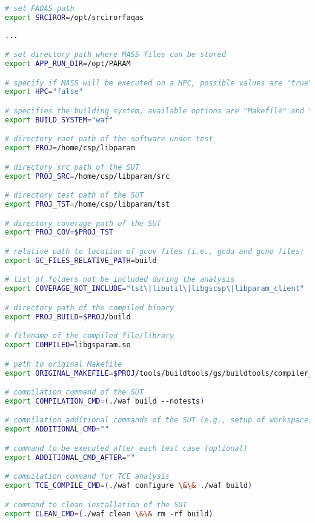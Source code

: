 \begin{lstlisting}[language=bash, label=mass_conf_single, caption=\MASS variables. Excerpt of mass\_conf.sh file.]
# set FAQAS path
export SRCIROR=/opt/srcirorfaqas
                                                     
...

# set directory path where MASS files can be stored
export APP_RUN_DIR=/opt/PARAM

# specify if MASS will be executed on a HPC, possible values are "true" or "false"
export HPC="false"

# specifies the building system, available options are "Makefile" and "waf"
export BUILD_SYSTEM="waf"

# directory root path of the software under test
export PROJ=/home/csp/libparam

# directory src path of the SUT
export PROJ_SRC=/home/csp/libparam/src

# directory test path of the SUT
export PROJ_TST=/home/csp/libparam/tst

# directory coverage path of the SUT
export PROJ_COV=$PROJ_TST

# relative path to location of gcov files (i.e., gcda and gcno files)
export GC_FILES_RELATIVE_PATH=build

# list of folders not be included during the analysis
export COVERAGE_NOT_INCLUDE="tst\|libutil\|libgscsp\|libparam_client"

# directory path of the compiled binary
export PROJ_BUILD=$PROJ/build

# filename of the compiled file/library
export COMPILED=libgsparam.so

# path to original Makefile
export ORIGINAL_MAKEFILE=$PROJ/tools/buildtools/gs/buildtools/compiler_settings.json

# compilation command of the SUT
export COMPILATION_CMD=(./waf build --notests)

# compilation additional commands of the SUT (e.g., setup of workspace) (optional)
export ADDITIONAL_CMD=""

# command to be executed after each test case (optional)
export ADDITIONAL_CMD_AFTER=""

# compilation command for TCE analysis
export TCE_COMPILE_CMD=(./waf configure \&\& ./waf build)

# command to clean installation of the SUT
export CLEAN_CMD=(./waf clean \&\& rm -rf build)
\end{lstlisting}

